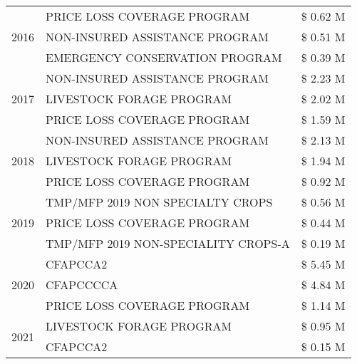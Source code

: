 \begin{tabular}{llr}
\multirow[t]{3}{*}{2016} & PRICE LOSS COVERAGE PROGRAM & \$ 0.62 M \\
 & NON-INSURED ASSISTANCE PROGRAM & \$ 0.51 M \\
 & EMERGENCY CONSERVATION PROGRAM & \$ 0.39 M \\
\cline{1-3}
\multirow[t]{3}{*}{2017} & NON-INSURED ASSISTANCE PROGRAM & \$ 2.23 M \\
 & LIVESTOCK FORAGE PROGRAM & \$ 2.02 M \\
 & PRICE LOSS COVERAGE PROGRAM & \$ 1.59 M \\
\cline{1-3}
\multirow[t]{3}{*}{2018} & NON-INSURED ASSISTANCE PROGRAM & \$ 2.13 M \\
 & LIVESTOCK FORAGE PROGRAM & \$ 1.94 M \\
 & PRICE LOSS COVERAGE PROGRAM & \$ 0.92 M \\
\cline{1-3}
\multirow[t]{3}{*}{2019} & TMP/MFP 2019 NON SPECIALTY CROPS & \$ 0.56 M \\
 & PRICE LOSS COVERAGE PROGRAM & \$ 0.44 M \\
 & TMP/MFP 2019 NON-SPECIALITY CROPS-A & \$ 0.19 M \\
\cline{1-3}
\multirow[t]{3}{*}{2020} & CFAPCCA2 & \$ 5.45 M \\
 & CFAPCCCCA & \$ 4.84 M \\
 & PRICE LOSS COVERAGE PROGRAM & \$ 1.14 M \\
\cline{1-3}
\multirow[t]{2}{*}{2021} & LIVESTOCK FORAGE PROGRAM & \$ 0.95 M \\
 & CFAPCCA2 & \$ 0.15 M \\
\cline{1-3}
\bottomrule
\end{tabular}
